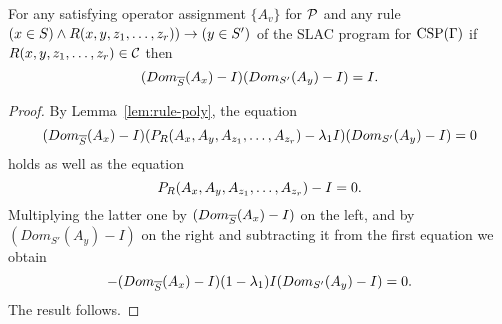 \documentclass[11pt,letter]{article}
\begin{document}
\begin{lemma}\label{lem:derivation-poly}
For any satisfying operator assignment $\{A_v\}$ for ${\mathcal P}$ and any rule $(x\in S)\wedge R(x,y,z _1,\ldots, z _{r}))\to (y\in S')$ of the SLAC program for ${\rm CSP}(\Gamma)$ if 
$R(x,y,z _1,\ldots, z _{r})\in{\mathcal C}$ then 
\[
(Dom_{\overline S}(A_x)-I)(Dom_{S'}(A_y)-I)=I.
\]
\end{lemma}
\begin{proof}
By Lemma~\ref{lem:rule-poly}, the equation 
\[
(Dom_{\overline S}(A_x)-I)(P_R(A_x,A_y,A_{z_1},\ldots, A_{z_r})-\lambda_1I)
(Dom_{S'}(A_y)-I)=0
\]
holds as well as the equation 
\[
P_R(A_x,A_y,A_{z_1},\ldots, A_{z_r})-I=0.
\]
Multiplying the latter one by $(Dom_{\overline S}(A_x)-I)$ on the left, and 
by $(Dom_{S'}(A_y)-I)$ on the right and subtracting it from the first equation
we obtain
\[
-(Dom_{\overline S}(A_x)-I)(1-\lambda_1)I(Dom_{S'}(A_y)-I)=0.
\]
The result follows.
\end{proof}
\end{document}
